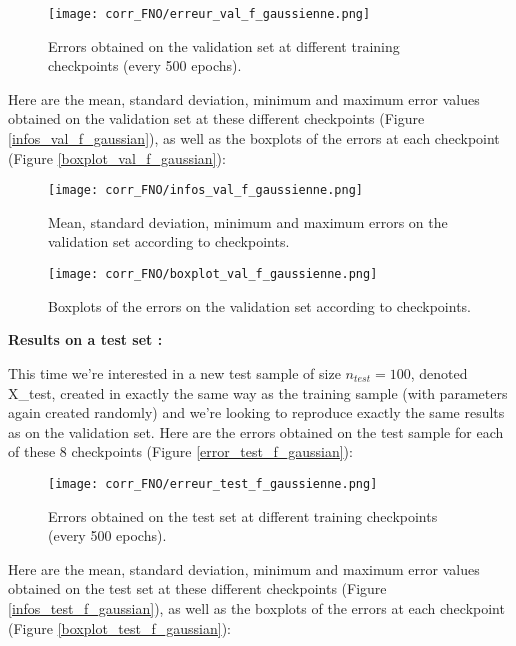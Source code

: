 \begin{figure}[H]
	\centering
	\texttt{[image: corr\_FNO/erreur\_val\_f\_gaussienne.png]}
	\caption{Errors obtained on the validation set at different training checkpoints (every 500 epochs).}
	\label{erreur_val_f_gaussienne}
\end{figure} 

Here are the mean, standard deviation, minimum and maximum error values obtained on the validation set at these different checkpoints (Figure \ref{infos_val_f_gaussian}), as well as the boxplots of the errors at each checkpoint (Figure \ref{boxplot_val_f_gaussian}):

\begin{minipage}{0.48\linewidth}
	\begin{figure}[H]
		\centering
		\texttt{[image: corr\_FNO/infos\_val\_f\_gaussienne.png]}
		\caption{Mean, standard deviation, minimum and maximum errors on the validation set according to checkpoints.}
		\label{infos_val_f_gaussienne}
	\end{figure} 
\end{minipage}
\begin{minipage}{0.48\linewidth}
	\begin{figure}[H]
		\centering
		\texttt{[image: corr\_FNO/boxplot\_val\_f\_gaussienne.png]}
		\caption{Boxplots of the errors on the validation set according to checkpoints.}
		\label{boxplot_val_f_gaussienne}
	\end{figure} 
\end{minipage}

\textbf{Results on a test set :}

This time we're interested in a new test sample of size $n_{test}=100$, denoted X\_test, created in exactly the same way as the training sample (with parameters again created randomly) and we're looking to reproduce exactly the same results as on the validation set. Here are the errors obtained on the test sample for each of these 8 checkpoints (Figure \ref{error_test_f_gaussian}):

\begin{figure}[H]
	\centering
	\texttt{[image: corr\_FNO/erreur\_test\_f\_gaussienne.png]}
	\caption{Errors obtained on the test set at different training checkpoints (every 500 epochs).}
	\label{erreur_test_f_gaussienne}
\end{figure} 

Here are the mean, standard deviation, minimum and maximum error values obtained on the test set at these different checkpoints (Figure \ref{infos_test_f_gaussian}), as well as the boxplots of the errors at each checkpoint (Figure \ref{boxplot_test_f_gaussian}):

